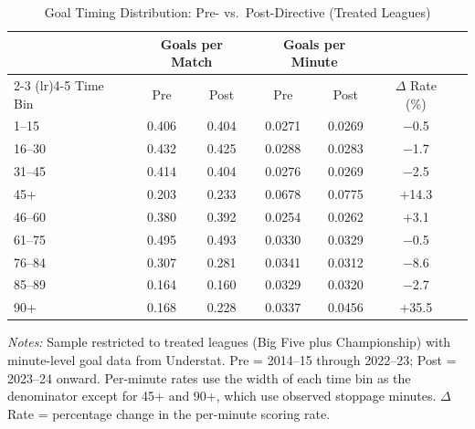 \begin{table}[htbp]
\centering
\caption{Goal Timing Distribution: Pre- vs.\ Post-Directive (Treated Leagues)}
\label{tab:goal_timing}
\small
\begin{threeparttable}
\begin{tabular}{lcccccc}
\toprule
 & \multicolumn{2}{c}{Goals per Match} & \multicolumn{2}{c}{Goals per Minute} & \\
\cmidrule(lr){2-3} \cmidrule(lr){4-5}
Time Bin & Pre & Post & Pre & Post & $\Delta$ Rate (\%) \\
\midrule
1--15   & 0.406 & 0.404 & 0.0271 & 0.0269 & $-$0.5 \\
16--30  & 0.432 & 0.425 & 0.0288 & 0.0283 & $-$1.7 \\
31--45  & 0.414 & 0.404 & 0.0276 & 0.0269 & $-$2.5 \\
45+     & 0.203 & 0.233 & 0.0678 & 0.0775 & $+$14.3 \\
46--60  & 0.380 & 0.392 & 0.0254 & 0.0262 & $+$3.1 \\
61--75  & 0.495 & 0.493 & 0.0330 & 0.0329 & $-$0.5 \\
76--84  & 0.307 & 0.281 & 0.0341 & 0.0312 & $-$8.6 \\
85--89  & 0.164 & 0.160 & 0.0329 & 0.0320 & $-$2.7 \\
90+     & 0.168 & 0.228 & 0.0337 & 0.0456 & $+$35.5 \\
\bottomrule
\end{tabular}
\begin{tablenotes}[flushleft]\footnotesize
\item \textit{Notes:} Sample restricted to treated leagues (Big Five plus Championship) with minute-level goal data from Understat. Pre = 2014--15 through 2022--23; Post = 2023--24 onward. Per-minute rates use the width of each time bin as the denominator except for 45+ and 90+, which use observed stoppage minutes. $\Delta$ Rate = percentage change in the per-minute scoring rate.
\end{tablenotes}
\end{threeparttable}
\end{table}
